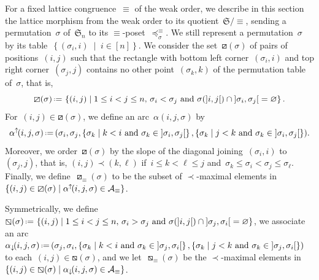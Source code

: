 \documentclass{amsart}
\theoremstyle{definition}
\newcommand{\f}[1]{{\mathfrak{#1}}} %
\newcommand{\set}[2]{\left\{ #1 \;\middle|\; #2 \right\}} %
\newcommand{\eqdef}{\mbox{\,\raisebox{0.2ex}{\scriptsize\ensuremath{\mathrm:}}\ensuremath{=}\,}} %
\newcommand{\Vincent}[1]{\todo[color=blue!30,inline]{#1 \\ \hfill --- V.}}
\newcommand{\arcs}{{\mathcal{A}}} %
\newcommand{\arcDown}{\smash{\alpha_{\downarrow\!}}} %
\newcommand{\arcUp}{\smash{\alpha^{\uparrow\!}}} %
\begin{document}
For a fixed lattice congruence~$\equiv$ of the weak order, we describe in this section the lattice morphism from the weak order to its quotient~$\f{S}/{\equiv}$, sending a permutation~$\sigma$ of~$\f{S}_n$ to its $\equiv$-poset~$\preccurlyeq_\sigma^\equiv$.
%
%
%
%
We still represent a permutation~$\sigma$ by its table~$\set{(\sigma_i, i)}{i \in [n]}$.
We consider the set~$\boxslash(\sigma)$ of pairs of positions~$(i,j)$ such that the rectangle with bottom left corner~$(\sigma_i, i)$ and top right corner~$(\sigma_j, j)$ contains no other point~$(\sigma_k, k)$ of the permutation table of~$\sigma$, that is,
\[
\boxslash(\sigma) \eqdef \set{(i, j)}{1 \le i < j \le n, \, \sigma_i < \sigma_j \text{ and } \sigma({]i,j[}) \cap {]\sigma_i, \sigma_j[} = \varnothing}.
\]
For~$(i, j) \in \boxslash(\sigma)$, we define an arc~$\alpha(i, j, \sigma)$ by
\[
\arcUp(i, j, \sigma) \eqdef (\sigma_i, \sigma_j, \set{\sigma_k}{k < i \text{ and } \sigma_k \in {]\sigma_i, \sigma_j[}}, \set{\sigma_k}{j < k \text{ and } \sigma_k \in {]\sigma_i, \sigma_j[}}).
\]
Moreover, we order~$\boxslash(\sigma)$ by the slope of the diagonal joining~$(\sigma_i, i)$ to~$(\sigma_j, j)$, that is, $(i, j) \prec (k,\ell)$ if~$i \le k < \ell \le j$ and~$\sigma_k \le \sigma_i < \sigma_j \le \sigma_\ell$.
Finally, we define~$\boxslash_\equiv(\sigma)$ to be the subset of $\prec$-maximal elements in~$\set{(i, j) \in \boxslash(\sigma)}{\arcUp(i, j, \sigma) \in \arcs_\equiv}$.

Symmetrically, we define~$\boxbslash(\sigma) \eqdef \set{(i, j)}{1 \le i < j \le n, \, \sigma_i > \sigma_j \text{ and } \sigma({]i,j[}) \cap {]\sigma_j, \sigma_i[} = \varnothing}$, we associate an arc~$\arcDown(i, j, \sigma) \eqdef (\sigma_j, \sigma_i, \set{\sigma_k}{k < i \text{ and } \sigma_k \in {]\sigma_j, \sigma_i[}}, \set{\sigma_k}{j < k \text{ and } \sigma_k \in {]\sigma_j, \sigma_i[}})$ to each~${(i,j) \in \boxbslash(\sigma)}$, and we let~$\boxbslash_\equiv(\sigma)$ be the $\prec$-maximal elements in~$\set{(i, j) \in \boxbslash(\sigma)}{\arcDown(i, j, \sigma) \in \arcs_\equiv}$.
\end{document}
